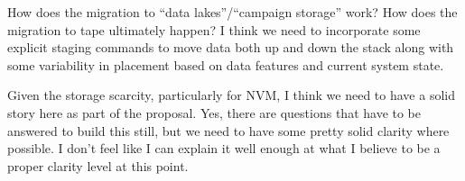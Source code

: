 How does the migration to ``data lakes''/``campaign storage'' work? How does the
migration to tape ultimately happen? I think we need to incorporate some
explicit staging commands to move data both up and down the stack along with
some variability in placement based on data features and current system state. 

Given the storage scarcity, particularly for NVM, I think we need to have a
solid story here as part of the proposal. Yes, there are questions that have to
be answered to build this still, but we need to have some pretty solid clarity
where possible. I don't feel like I can explain it well enough at what I
believe to be a proper clarity level at this point.

